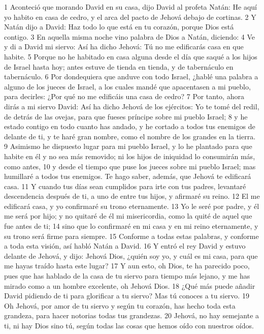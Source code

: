 1 Aconteció que morando David en su casa, dijo David al profeta Natán: He aquí yo habito en casa de cedro, y el arca del pacto de Jehová debajo de cortinas.
2 Y Natán dijo a David: Haz todo lo que está en tu corazón, porque Dios está contigo.
3 En aquella misma noche vino palabra de Dios a Natán, diciendo:
4 Ve y di a David mi siervo: Así ha dicho Jehová: Tú no me edificarás casa en que habite.
5 Porque no he habitado en casa alguna desde el día que saqué a los hijos de Israel hasta hoy; antes estuve de tienda en tienda, y de tabernáculo en tabernáculo.
6 Por dondequiera que anduve con todo Israel, ¿hablé una palabra a alguno de los jueces de Israel, a los cuales mandé que apacentasen a mi pueblo, para decirles: ¿Por qué no me edificáis una casa de cedro?
7 Por tanto, ahora dirás a mi siervo David: Así ha dicho Jehová de los ejércitos: Yo te tomé del redil, de detrás de las ovejas, para que fueses príncipe sobre mi pueblo Israel;
8 y he estado contigo en todo cuanto has andado, y he cortado a todos tus enemigos de delante de ti, y te haré gran nombre, como el nombre de los grandes en la tierra.
9 Asimismo he dispuesto lugar para mi pueblo Israel, y lo he plantado para que habite en él y no sea más removido; ni los hijos de iniquidad lo consumirán más, como antes,
10 y desde el tiempo que puse los jueces sobre mi pueblo Israel; mas humillaré a todos tus enemigos. Te hago saber, además, que Jehová te edificará casa.
11 Y cuando tus días sean cumplidos para irte con tus padres, levantaré descendencia después de ti, a uno de entre tus hijos, y afirmaré su reino.
12 El me edificará casa, y yo confirmaré su trono eternamente.
13 Yo le seré por padre, y él me será por hijo; y no quitaré de él mi misericordia, como la quité de aquel que fue antes de ti;
14 sino que lo confirmaré en mi casa y en mi reino eternamente, y su trono será firme para siempre.
15 Conforme a todas estas palabras, y conforme a toda esta visión, así habló Natán a David.
16 Y entró el rey David y estuvo delante de Jehová, y dijo: Jehová Dios, ¿quién soy yo, y cuál es mi casa, para que me hayas traído hasta este lugar?
17 Y aun esto, oh Dios, te ha parecido poco, pues que has hablado de la casa de tu siervo para tiempo más lejano, y me has mirado como a un hombre excelente, oh Jehová Dios.
18 ¿Qué más puede añadir David pidiendo de ti para glorificar a tu siervo? Mas tú conoces a tu siervo.
19 Oh Jehová, por amor de tu siervo y según tu corazón, has hecho toda esta grandeza, para hacer notorias todas tus grandezas.
20 Jehová, no hay semejante a ti, ni hay Dios sino tú, según todas las cosas que hemos oído con nuestros oídos.
